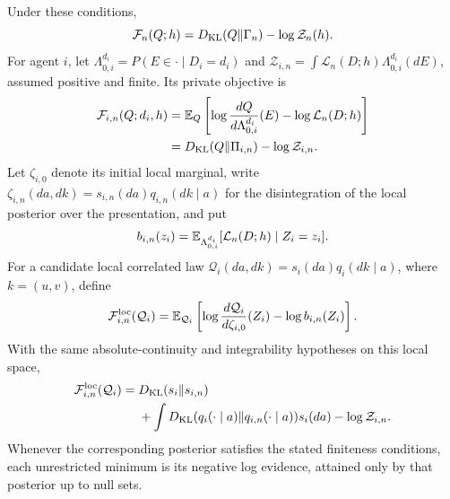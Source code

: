 Under these conditions,
\begin{equation}
 \mathcal F_n(Q;h)=D_{\mathrm{KL}}(Q\Vert\Gamma_n)-\log\mathcal Z_n(h).
 \label{imem:full-free-energy-identity}
\end{equation}
For agent $i$, let $\Lambda_{0,i}^{d_i}=P(E\in\cdot\mid D_i=d_i)$ and
$\mathcal Z_{i,n}=\int\mathcal L_n(D;h)\Lambda_{0,i}^{d_i}(dE)$, assumed positive and finite. Its private objective is
\begin{equation}
 \begin{split}
 \mathcal F_{i,n}(Q;d_i,h)
 &=\mathbb E_Q\left[
 \log\frac{dQ}{d\Lambda_{0,i}^{d_i}}(E)-\log\mathcal L_n(D;h)\right]\\
 &=D_{\mathrm{KL}}(Q\Vert\Pi_{i,n})-\log\mathcal Z_{i,n}.
 \end{split}
 \label{imem:private-free-energy}
\end{equation}
Let $\zeta_{i,0}$ denote its initial local marginal, write $\zeta_{i,n}(da,dk)=s_{i,n}(da)q_{i,n}(dk\mid a)$ for the disintegration of the local posterior over the presentation, and put
\begin{equation}
 b_{i,n}(z_i)=\mathbb E_{\Lambda_{0,i}^{d_i}}
 [\mathcal L_n(D;h)\mid Z_i=z_i].
 \label{imem:local-history-likelihood}
\end{equation}
For a candidate local correlated law $\mathcal Q_i(da,dk)=s_i(da)q_i(dk\mid a)$, where $k=(u,v)$, define
\begin{equation}
 \mathcal F_{i,n}^{\mathrm{loc}}(\mathcal Q_i)
 =\mathbb E_{\mathcal Q_i}\left[
 \log\frac{d\mathcal Q_i}{d\zeta_{i,0}}(Z_i)-\log b_{i,n}(Z_i)\right].
 \label{imem:local-free-energy}
\end{equation}
With the same absolute-continuity and integrability hypotheses on this local space,
\begin{equation}
 \begin{split}
 \mathcal F_{i,n}^{\mathrm{loc}}(\mathcal Q_i)
 ={}&D_{\mathrm{KL}}(s_i\Vert s_{i,n})\\
 &+\int D_{\mathrm{KL}}(q_i(\cdot\mid a)\Vert q_{i,n}(\cdot\mid a))s_i(da)
 -\log\mathcal Z_{i,n}.
 \end{split}
 \label{imem:local-free-energy-split}
\end{equation}
Whenever the corresponding posterior satisfies the stated finiteness conditions, each unrestricted minimum is its negative log evidence, attained only by that posterior up to null sets.
